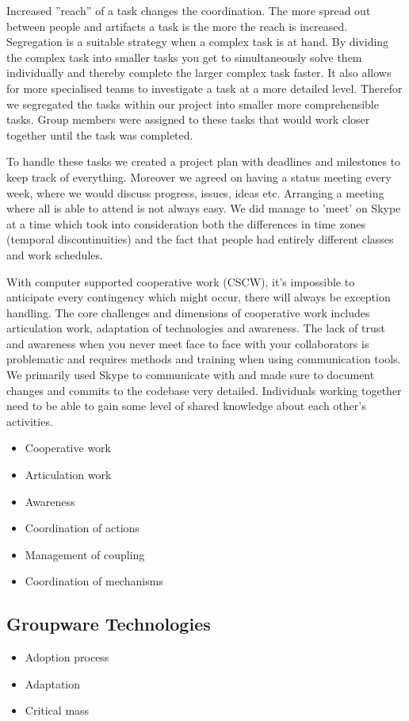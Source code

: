 Increased ''reach'' of a task changes the coordination. The more spread out between people and artifacts a task is the more the reach is increased. Segregation is a suitable strategy when a complex task is at hand. By dividing the complex task into smaller tasks you get to simultaneously solve them individually and thereby complete the larger complex task faster. It also allows for more specialised teams to investigate a task at a more detailed level. Therefor we segregated the tasks within our project into smaller more comprehensible tasks. Group members were assigned to these tasks that would work closer together until the task was completed. 

To handle these tasks we created a project plan with deadlines and milestones to keep track of everything. Moreover we agreed on having a status meeting every week, where we would discuss progress, issues, ideas etc. Arranging a meeting where all is able to attend is not always easy. We did manage to 'meet' on Skype at a time which took into consideration both the differences in time zones (temporal discontinuities) and the fact that people had entirely different classes and work schedules.

With computer supported cooperative work (CSCW), it's impossible to anticipate every contingency which might occur, there will always be exception handling. The core challenges and dimensions of cooperative work includes articulation work, adaptation of technologies and awareness. The lack of trust and awareness when you never meet face to face with your collaborators is problematic and requires methods and training when using communication tools. We primarily used Skype to communicate with and made sure to document changes and commits to the codebase very detailed. Individuals working together need to be able to gain some level of shared knowledge about each other's activities.


\begin{itemize}
  \item Cooperative work
  \item Articulation work
  \item Awareness
	\item Coordination of actions
	\item Management of coupling
	\item Coordination of mechanisms
\end{itemize}

\subsection{Groupware Technologies}
\begin{itemize}
  \item Adoption process
  \item Adaptation
  \item Critical mass
\end{itemize}

